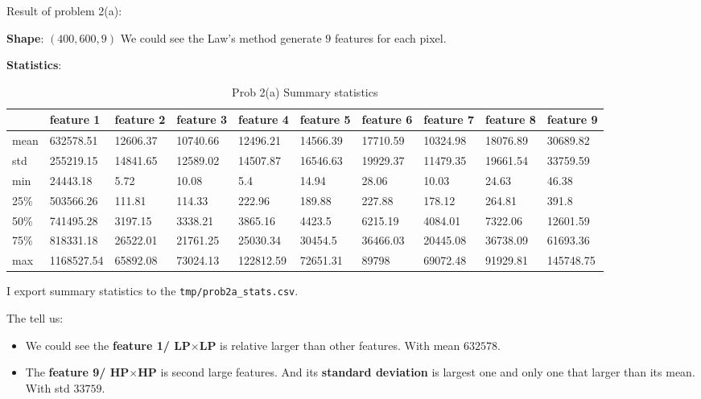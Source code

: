 Result of problem 2(a):

\textbf{Shape}: \((400, 600, 9)\)
We could see the Law's method generate \(9\) features for each pixel.

\textbf{Statistics}:
\begin{table}[]
\begin{adjustwidth}{-2cm}{}
\begin{tabularx}{\paperwidth}{X|l|l|l|l|l|l|l|l|l|}
\cline{2-10}
                           & feature 1  & feature 2 & feature 3 & feature 4 & feature 5 & feature 6 & feature 7 & feature 8 & feature 9 \\ \hline
\multicolumn{1}{|l|}{mean} & 632578.51  & 12606.37  & 10740.66  & 12496.21  & 14566.39  & 17710.59  & 10324.98  & 18076.89  & 30689.82  \\ \hline
\multicolumn{1}{|l|}{std}  & 255219.15  & 14841.65  & 12589.02  & 14507.87  & 16546.63  & 19929.37  & 11479.35  & 19661.54  & 33759.59  \\ \hline
\multicolumn{1}{|l|}{min}  & 24443.18   & 5.72      & 10.08     & 5.4       & 14.94     & 28.06     & 10.03     & 24.63     & 46.38     \\ \hline
\multicolumn{1}{|l|}{25\%} & 503566.26  & 111.81    & 114.33    & 222.96    & 189.88    & 227.88    & 178.12    & 264.81    & 391.8     \\ \hline
\multicolumn{1}{|l|}{50\%} & 741495.28  & 3197.15   & 3338.21   & 3865.16   & 4423.5    & 6215.19   & 4084.01   & 7322.06   & 12601.59  \\ \hline
\multicolumn{1}{|l|}{75\%} & 818331.18  & 26522.01  & 21761.25  & 25030.34  & 30454.5   & 36466.03  & 20445.08  & 36738.09  & 61693.36  \\ \hline
\multicolumn{1}{|l|}{max}  & 1168527.54 & 65892.08  & 73024.13  & 122812.59 & 72651.31  & 89798     & 69072.48  & 91929.81  & 145748.75 \\ \hline
\end{tabularx}
\caption{Prob 2(a) Summary statistics}
\label{table:prob2a}
\end{adjustwidth}
\end{table}
I export summary statistics to the \texttt{tmp/prob2a\_stats.csv}.

The  tell us:
\begin{itemize}
    \item We could see the \textbf{feature 1/ LP\(\times\)LP} is relative larger than other features. With mean \(632578\).
    \item The \textbf{feature 9/ HP\(\times\)HP} is second large features. And its \textbf{standard deviation} is largest one and only one that larger than its mean. With std \(33759\).
\end{itemize}

